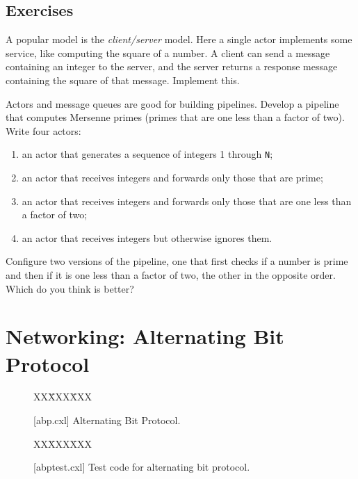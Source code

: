 \documentclass{report}
\newcommand{\cxlsource}[1]{
\begin{tabbing}
XX\=XXX\=XXX\kill
    
\end{tabbing}
}
\newenvironment{code}{
\tcolorbox
}{
\endtcolorbox
}
\begin{document}
\section*{Exercises}
\begin{problems}
\item \label{ex:cltsvr} A popular model is the \emph{client/server} model.
Here a single actor implements some service, like computing the square of a
number.
A client can send a message containing an integer to the server, and the
server returns a response message containing the square of that message.
Implement this.
\item Actors and message queues are good for building pipelines.
Develop a pipeline that computes Mersenne primes (primes that are one less
than a factor of two).  Write four actors:
\begin{enumerate}
\item an actor that generates a sequence of integers 1 through \texttt{N};
\item an actor that receives integers and forwards only those that are prime;
\item an actor that receives integers and forwards only those that are one
less than a factor of two;
\item an actor that receives integers but otherwise ignores them.
\end{enumerate}
Configure two versions of the pipeline, one that first checks if a number
is prime and then if it is one less than a factor of two, the other
in the opposite order.  Which do you think is better?
\end{problems}

\chapter{Networking: Alternating Bit Protocol}
\label{ch:abp}

\begin{figure}
\begin{code}
\cxlsource{abp}
\end{code}
\caption{[abp.cxl] Alternating Bit Protocol.}
\label{fig:abp}
\end{figure}

\begin{figure}
\begin{code}
\cxlsource{abptest}
\end{code}
\caption{[abptest.cxl] Test code for alternating bit protocol.}
\label{fig:abptest}
\end{figure}
\end{document}
